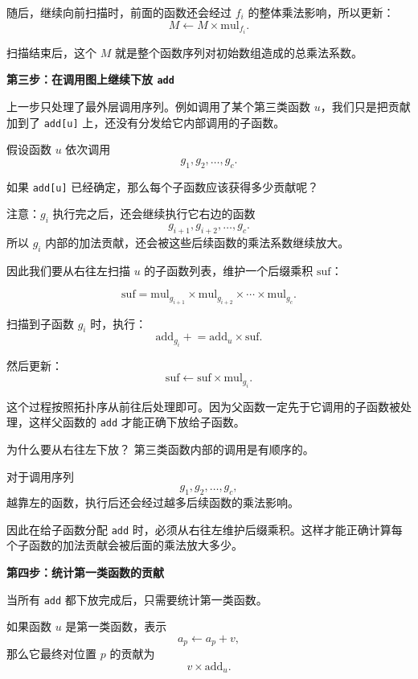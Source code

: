 \documentclass{book}
\newcommand{\code}[1]{\colorbox{codebg}{\texttt{#1}}}  %
\begin{document}
随后，继续向前扫描时，前面的函数还会经过 $f_i$ 的整体乘法影响，所以更新：
\[
M \leftarrow M\times \mathrm{mul}_{f_i}.
\]

扫描结束后，这个 $M$ 就是整个函数序列对初始数组造成的总乘法系数。

\par\medskip
\noindent\textbf{第三步：在调用图上继续下放 \code{add}}
\par\medskip

上一步只处理了最外层调用序列。例如调用了某个第三类函数 $u$，我们只是把贡献加到了 \code{add[u]} 上，还没有分发给它内部调用的子函数。

假设函数 $u$ 依次调用
\[
g_1,g_2,\ldots,g_c.
\]

如果 \code{add[u]} 已经确定，那么每个子函数应该获得多少贡献呢？

注意：$g_i$ 执行完之后，还会继续执行它右边的函数
\[
g_{i+1},g_{i+2},\ldots,g_c.
\]
所以 $g_i$ 内部的加法贡献，还会被这些后续函数的乘法系数继续放大。

因此我们要从右往左扫描 $u$ 的子函数列表，维护一个后缀乘积 $\mathrm{suf}$：

\[
\mathrm{suf}
=
\mathrm{mul}_{g_{i+1}}
\times
\mathrm{mul}_{g_{i+2}}
\times
\cdots
\times
\mathrm{mul}_{g_c}.
\]

扫描到子函数 $g_i$ 时，执行：
\[
\mathrm{add}_{g_i}
\mathrel{+}=
\mathrm{add}_u\times \mathrm{suf}.
\]

然后更新：
\[
\mathrm{suf}
\leftarrow
\mathrm{suf}\times \mathrm{mul}_{g_i}.
\]

这个过程按照拓扑序从前往后处理即可。因为父函数一定先于它调用的子函数被处理，这样父函数的 \code{add} 才能正确下放给子函数。

\begin{keybox}{为什么要从右往左下放？}
第三类函数内部的调用是有顺序的。

对于调用序列
\[
g_1,g_2,\ldots,g_c,
\]
越靠左的函数，执行后还会经过越多后续函数的乘法影响。

因此在给子函数分配 \code{add} 时，必须从右往左维护后缀乘积。这样才能正确计算每个子函数的加法贡献会被后面的乘法放大多少。
\end{keybox}

\par\medskip
\noindent\textbf{第四步：统计第一类函数的贡献}
\par\medskip

当所有 \code{add} 都下放完成后，只需要统计第一类函数。

如果函数 $u$ 是第一类函数，表示
\[
a_p \leftarrow a_p+v,
\]
那么它最终对位置 $p$ 的贡献为
\[
v\times \mathrm{add}_u.
\]
\end{document}
